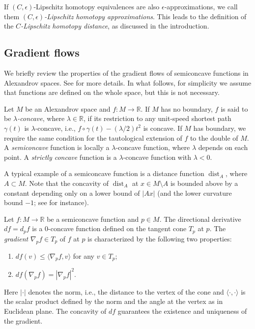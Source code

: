 \documentclass[a4paper,12pt]{amsart}
\theoremstyle{plain}
\theoremstyle{definition}
\numberwithin{thm}{section}
\numberwithin{equation}{section}
\DeclareMathOperator{\dist}{dist}
\begin{document}
If $(C,\epsilon)$-Lipschitz homotopy equivalences are also $\epsilon$-approximations, we call them \textit{$(C,\epsilon)$-Lipschitz homotopy approximations}.
This leads to the definition of the \textit{$C$-Lipschitz homotopy distance}, as discussed in the introduction.

\subsection{Gradient flows}

We briefly review the properties of the gradient flows of semiconcave functions in Alexandrov spaces.
See \cite{Pet:sc} for more details.
In what follows, for simplicity we assume that functions are defined on the whole space, but this is not necessary.

Let $M$ be an Alexandrov space and $f:M\to\mathbb R$.
If $M$ has no boundary, $f$ is said to be \textit{$\lambda$-concave}, where $\lambda\in\mathbb R$, if its restriction to any unit-speed shortest path $\gamma(t)$ is $\lambda$-concave, i.e., $f\circ\gamma(t)-(\lambda/2)t^2$ is concave.
If $M$ has boundary, we require the same condition for the tautological extension of $f$ to the double of $M$.
A \textit{semiconcave} function is locally a $\lambda$-concave function, where $\lambda$ depends on each point.
A \textit{strictly concave} function is a $\lambda$-concave function with $\lambda<0$.

A typical example of a semiconcave function is a distance function $\dist_A$, where $A\subset M$.
Note that the concavity of $\dist_A$ at $x\in M\setminus A$ is bounded above by a constant depending only on a lower bound of $|Ax|$ (and the lower curvature bound $-1$; see \cite[2.4]{MY:loc} for instance).

Let $f:M\to\mathbb R$ be a semiconcave function and $p\in M$.
The directional derivative $df=d_pf$ is a $0$-concave function defined on the tangent cone $T_p$ at $p$.
The \textit{gradient} $\nabla_pf\in T_p$ of $f$ at $p$ is characterized by the following two properties:
\begin{enumerate}
\item $df(v)\le\langle\nabla_pf,v\rangle$ for any $v\in T_p$;
\item $df(\nabla_pf)=|\nabla_pf|^2$.
\end{enumerate}
Here $|\cdot|$ denotes the norm, i.e., the distance to the vertex of the cone and $\langle\cdot,\cdot\rangle$ is the scalar product defined by the norm and the angle at the vertex as in Euclidean plane.
The concavity of $df$ guarantees the existence and uniqueness of the gradient.
\end{document}
